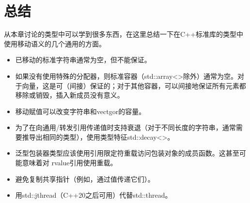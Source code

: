 \section{总结}
从本章讨论的类型中可以学到很多东西，在这里总结一下在C++标准库的类型中使用移动语义的几个通用的方面。

\begin{itemize}
	\item 已移动的标准字符串通常为空，但不能保证。
	\item 如果没有使用特殊的分配器，则标准容器（std::array<>除外）通常为空。对于向量，这是可（间接）保证的；对于其他容器，可以间接地保证所有元素都移除或销毁，插入新成员没有意义。
	\item 移动赋值可以改变字符串和vectgor的容量。
	\item 为了在向通用/转发引用传递值时支持衰退（对于不同长度的字符串，通常需要推导出相同的类型），使用类型特征std::decay<>。
	\item 泛型包装器类型应该使用引用限定符重载访问包装对象的成员函数。这甚至可能意味着对 rvalue引用使用重载。
	\item 避免复制共享指针（例如，通过值传递它们）。
	\item 用std::jthread（C++20之后可用）代替std::thread。
\end{itemize}


